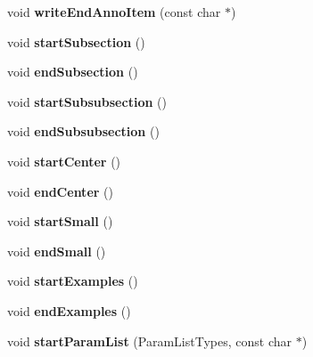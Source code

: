 \begin{DoxyCompactItemize}
void {\bfseries write\+End\+Anno\+Item} (const char $\ast$)
\item 
\mbox{\label{class_html_generator_ad5672bd4e2cf016436ce21392f366868}} 
void {\bfseries start\+Subsection} ()
\item 
\mbox{\label{class_html_generator_abc4bc4379bbff6450b129ac605dc9416}} 
void {\bfseries end\+Subsection} ()
\item 
\mbox{\label{class_html_generator_a36a9752e811198e008617ad624066be0}} 
void {\bfseries start\+Subsubsection} ()
\item 
\mbox{\label{class_html_generator_af08ae4e64ba09f0e0d4afbf496011243}} 
void {\bfseries end\+Subsubsection} ()
\item 
\mbox{\label{class_html_generator_a233402f133de12862b43bfdd202fd050}} 
void {\bfseries start\+Center} ()
\item 
\mbox{\label{class_html_generator_abc11851ba8f0b133e5c664ecd9504496}} 
void {\bfseries end\+Center} ()
\item 
\mbox{\label{class_html_generator_abfec4f0b6bf47b4bf4635876f094363e}} 
void {\bfseries start\+Small} ()
\item 
\mbox{\label{class_html_generator_aae94afd45fc65086afdc6c3204e67a1f}} 
void {\bfseries end\+Small} ()
\item 
\mbox{\label{class_html_generator_a5fd46956f97ff9a2fdb3b425229e0488}} 
void {\bfseries start\+Examples} ()
\item 
\mbox{\label{class_html_generator_acc716c5b5ae303c1348eeaa39e872a58}} 
void {\bfseries end\+Examples} ()
\item 
\mbox{\label{class_html_generator_a65ea430579ba2d902cfb1afbb740f225}} 
void {\bfseries start\+Param\+List} (Param\+List\+Types, const char $\ast$)
\item 
\mbox{\label{class_html_generator_a540b07cf18af5217bac8603e32c8586a}} 

\end{DoxyCompactItemize}
